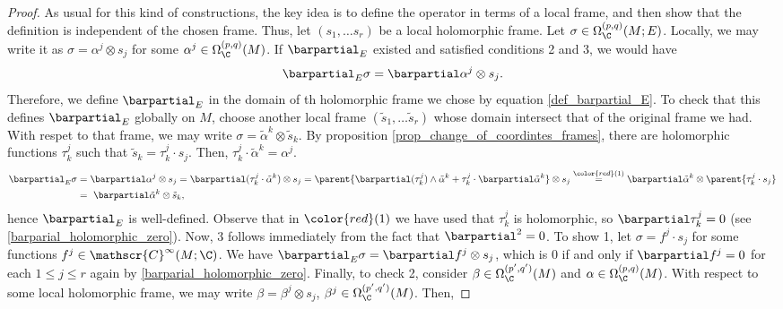 \begin{proof}
    As usual for this kind of constructions, the key idea is to define the operator in terms of a local frame, and then show that the definition is independent of the chosen frame. Thus, let \((s_1, \ldots s_r)\) be a local holomorphic frame. Let \(\sigma \in \Omega_\C^{(p,q)}(M;E)\). Locally, we may write it as \(\sigma=\alpha^j \otimes s_j\) for some \(\alpha^j \in \Omega_\C^{(p,q)}(M)\). If \(\barpartial_E\) existed and satisfied conditions 2 and 3, we would have 
    \begin{equation} \label{def_barpartial_E}
    \barpartial_E \sigma = \barpartial \alpha^j \otimes s_j.
    \end{equation}
    Therefore, we define \(\barpartial_E\) in the domain of th holomorphic frame we chose by equation \eqref{def_barpartial_E}. To check that this defines \(\barpartial_E\) globally on \(M\), choose another local frame \((\tilde{s}_1, \ldots \tilde{s}_r)\) whose domain intersect that of the original frame we had. With respet to that frame, we may write \(\sigma=\tilde{\alpha}^k \otimes \tilde{s}_k\). By proposition \ref{prop_change_of_coordintes_frames}, there are holomorphic functions \(\tau^j_k\) such that \(\tilde{s}_k=\tau^j_k \cdot s_j\). Then, \(\tau^j_k\cdot \tilde{\alpha}^k=\alpha^j\). 
    \begin{align*}
        \barpartial_E\sigma & = \barpartial \alpha^j \otimes s_j = \barpartial(\tau^j_k\cdot \tilde{\alpha}^k) \otimes s_j = \parent{\barpartial (\tau^j_k) \wedge \tilde{\alpha}^k + \tau^j_k \cdot \barpartial \tilde{\alpha}^k} \otimes s_j \overset{{\color{red}(1)}}{=} \barpartial \tilde{\alpha}^k \otimes \parent{\tau^j_k \cdot s_j} \\
        & = \ \barpartial \tilde{\alpha}^k \otimes \tilde{s}_k,
    \end{align*}
    hence \(\barpartial_E\) is well-defined. Observe that in \({\color{red}(1)}\) we have used that \(\tau^j_k\) is holomorphic, so \(\barpartial \tau^j_k=0\) (see \eqref{barparial_holomorphic_zero}). Now, 3 follows immediately from the fact that \(\barpartial^2=0\). To show 1, let \(\sigma=f^j \cdot s_j\) for some functions \(f^j \in \mathscr{C}^\infty(M;\C)\). We have \(\barpartial_E \sigma= \barpartial f^j \otimes s_j\), which is \(0\) if and only if \(\barpartial f^j=0\) for each \(1 \leq j \leq r\) again by \eqref{barparial_holomorphic_zero}. Finally, to check 2, consider \(\beta \in \Omega_\C^{(p',q')}(M)\) and \(\alpha \in \Omega_\C^{(p,q)}(M)\). With respect to some local holomorphic frame, we may write \(\beta=\beta^j \otimes s_j\), \(\beta^j \in \Omega_\C^{(p',q')}(M)\). Then,

\end{proof}
